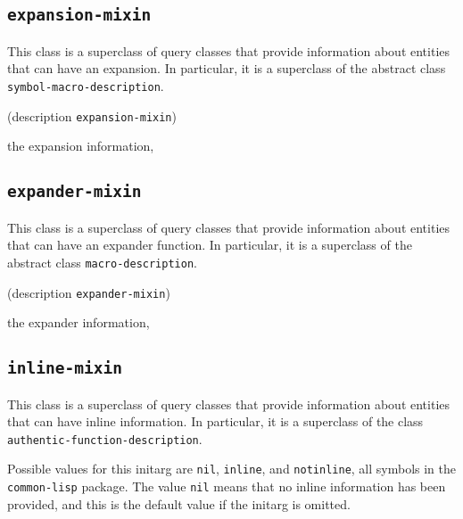 \subsection{\texttt{expansion-mixin}}
\label{sec-expansion-mixin}

{\footnotesize
{}
}

This class is a superclass of query classes that provide information
about entities that can have an expansion.  In particular, it is a
superclass of the abstract class \texttt{symbol-macro-description}.

{\footnotesize
{}
}

{\footnotesize
{} {(description {\tt expansion-mixin})}
}

 the expansion information, 

\subsection{\texttt{expander-mixin}}
\label{sec-expander-mixin}

{\footnotesize
{}
}

This class is a superclass of query classes that provide information
about entities that can have an expander function.  In particular, it is
a superclass of the abstract class \texttt{macro-description}.

{\footnotesize
{}
}

{\footnotesize
{} {(description {\tt expander-mixin})}
}

 the expander information, 

\subsection{\texttt{inline-mixin}}
\label{sec-inline-mixin}

{\footnotesize
{}
}

This class is a superclass of query classes that provide information
about entities that can have inline information.  In particular, it is a
superclass of the class \texttt{authentic-function-description}.

{\footnotesize
{}
}

Possible values for this initarg are \texttt{nil}, \texttt{inline},
and \texttt{notinline}, all symbols in the \texttt{common-lisp}
package.  The value \texttt{nil} means that no inline information has
been provided, and this is the default value if the initarg is omitted.

